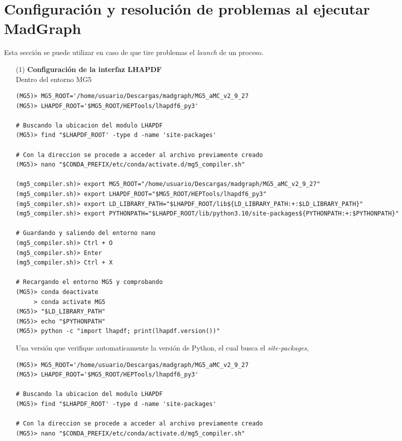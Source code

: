 \section{Configuración y resolución de problemas al ejecutar MadGraph}
Esta sección se puede utilizar en caso de que tire problemas el \textit{launch} de un proceso.
\begin{itemize}
    \item[(1)] \textbf{Configuración de la interfaz LHAPDF}\\
    Dentro del entorno MG5
    \begin{lstlisting}
(MG5)> MG5_ROOT='/home/usuario/Descargas/madgraph/MG5_aMC_v2_9_27
(MG5)> LHAPDF_ROOT='$MG5_ROOT/HEPTools/lhapdf6_py3'

# Buscando la ubicacion del modulo LHAPDF
(MG5)> find "$LHAPDF_ROOT' -type d -name 'site-packages'

# Con la direccion se procede a acceder al archivo previamente creado
(MG5)> nano "$CONDA_PREFIX/etc/conda/activate.d/mg5_compiler.sh"

(mg5_compiler.sh)> export MG5_ROOT="/home/usuario/Descargas/madgraph/MG5_aMC_v2_9_27"
(mg5_compiler.sh)> export LHAPDF_ROOT="$MG5_ROOT/HEPTools/lhapdf6_py3"
(mg5_compiler.sh)> export LD_LIBRARY_PATH="$LHAPDF_ROOT/lib${LD_LIBRARY_PATH:+:$LD_LIBRARY_PATH}"
(mg5_compiler.sh)> export PYTHONPATH="$LHAPDF_ROOT/lib/python3.10/site-packages${PYTHONPATH:+:$PYTHONPATH}"

# Guardando y saliendo del entorno nano
(mg5_compiler.sh)> Ctrl + O
(mg5_compiler.sh)> Enter
(mg5_compiler.sh)> Ctrl + X

# Recargando el entorno MG5 y comprobando
(MG5)> conda deactivate
     > conda activate MG5
(MG5)> "$LD_LIBRARY_PATH"
(MG5)> echo "$PYTHONPATH"
(MG5)> python -c "import lhapdf; print(lhapdf.version())"
    \end{lstlisting}
    Una versión que verifique automaticamente la versión de Python, el cual busca el \textit{site-packages},
    \begin{lstlisting}
(MG5)> MG5_ROOT='/home/usuario/Descargas/madgraph/MG5_aMC_v2_9_27
(MG5)> LHAPDF_ROOT='$MG5_ROOT/HEPTools/lhapdf6_py3'

# Buscando la ubicacion del modulo LHAPDF
(MG5)> find "$LHAPDF_ROOT' -type d -name 'site-packages'

# Con la direccion se procede a acceder al archivo previamente creado
(MG5)> nano "$CONDA_PREFIX/etc/conda/activate.d/mg5_compiler.sh"


\end{lstlisting}
\end{itemize}
